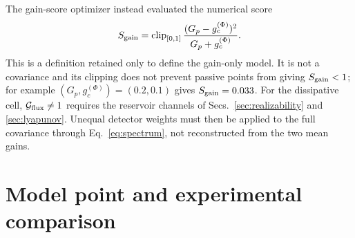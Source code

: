 \documentclass[11pt,a4paper]{article}
\begin{document}
The gain-score optimizer instead evaluated the numerical score
\begin{equation}
S_{\rm gain}=\operatorname{clip}_{[0,1]}
\frac{(G_p-g_c^{(\Phi)})^2}{G_p+g_c^{(\Phi)}} .
\label{eq:ids-legacy}
\end{equation}
This is a definition retained only to define the gain-only model. It is not a
covariance and its clipping does not prevent passive points from giving
$S_{\rm gain}<1$; for example $(G_p,g_c^{(\Phi)})=(0.2,0.1)$ gives
$S_{\rm gain}=0.033$. For the dissipative cell,
$\mathcal G_{\rm flux}\ne1$ requires the reservoir channels of
Secs.~\ref{sec:realizability} and \ref{sec:lyapunov}. Unequal detector weights
must then be applied to the full covariance through Eq.~\eqref{eq:spectrum},
not reconstructed from the two mean gains.

\clearpage
\section{Model point and experimental comparison}
\end{document}
